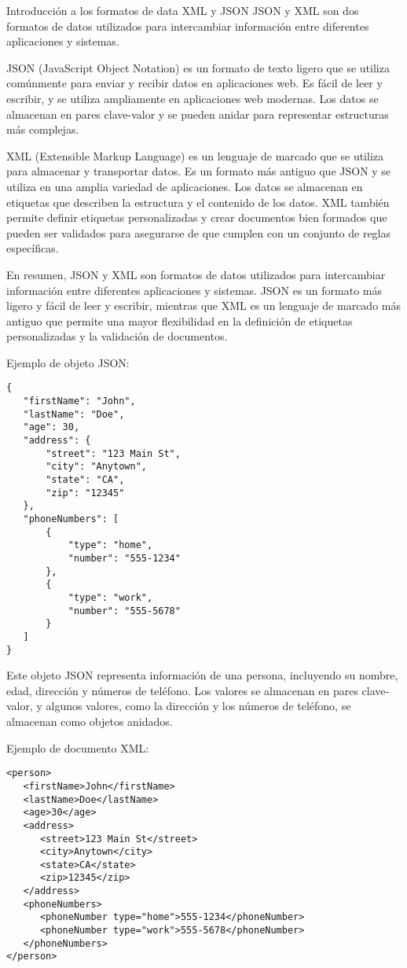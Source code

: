 \begin{frame}[fragile]{Introducción a los formatos de data XML y JSON}
\protect\hypertarget{introducciuxf3n-a-los-formatos-de-data-xml-y-json}{}
JSON y XML son dos formatos de datos utilizados para intercambiar
información entre diferentes aplicaciones y sistemas.

JSON (JavaScript Object Notation) es un formato de texto ligero que se
utiliza comúnmente para enviar y recibir datos en aplicaciones web. Es
fácil de leer y escribir, y se utiliza ampliamente en aplicaciones web
modernas. Los datos se almacenan en pares clave-valor y se pueden anidar
para representar estructuras más complejas.

XML (Extensible Markup Language) es un lenguaje de marcado que se
utiliza para almacenar y transportar datos. Es un formato más antiguo
que JSON y se utiliza en una amplia variedad de aplicaciones. Los datos
se almacenan en etiquetas que describen la estructura y el contenido de
los datos. XML también permite definir etiquetas personalizadas y crear
documentos bien formados que pueden ser validados para asegurarse de que
cumplen con un conjunto de reglas específicas.

En resumen, JSON y XML son formatos de datos utilizados para
intercambiar información entre diferentes aplicaciones y sistemas. JSON
es un formato más ligero y fácil de leer y escribir, mientras que XML es
un lenguaje de marcado más antiguo que permite una mayor flexibilidad en
la definición de etiquetas personalizadas y la validación de documentos.

Ejemplo de objeto JSON:

\begin{verbatim}
{
   "firstName": "John",
   "lastName": "Doe",
   "age": 30,
   "address": {
       "street": "123 Main St",
       "city": "Anytown",
       "state": "CA",
       "zip": "12345"
   },
   "phoneNumbers": [
       {
           "type": "home",
           "number": "555-1234"
       },
       {
           "type": "work",
           "number": "555-5678"
       }
   ]
}
\end{verbatim}

Este objeto JSON representa información de una persona, incluyendo su
nombre, edad, dirección y números de teléfono. Los valores se almacenan
en pares clave-valor, y algunos valores, como la dirección y los números
de teléfono, se almacenan como objetos anidados.

Ejemplo de documento XML:

\begin{verbatim}
<person>
   <firstName>John</firstName>
   <lastName>Doe</lastName>
   <age>30</age>
   <address>
      <street>123 Main St</street>
      <city>Anytown</city>
      <state>CA</state>
      <zip>12345</zip>
   </address>
   <phoneNumbers>
      <phoneNumber type="home">555-1234</phoneNumber>
      <phoneNumber type="work">555-5678</phoneNumber>
   </phoneNumbers>
</person>
\end{verbatim}


\end{frame}

